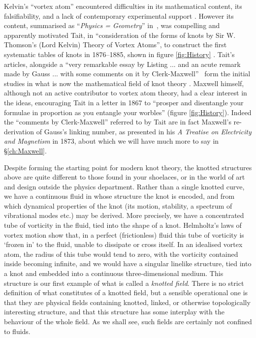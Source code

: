 Kelvin's ``vortex atom'' encountered difficulties in its mathematical content, its falsifiability, and a lack of contemporary experimental support \citep{KelvinMasters}. However its content, summarised as ``\textit{Physics = Geometry}'' in~\citep{KelvinAMS}, was compelling and apparently motivated Tait, in ``consideration of the forms of knots by Sir W. Thomson's (Lord Kelvin) Theory of Vortex Atoms'', to construct the first systematic tables of knots in 1876--1885, shown in figure \ref{fig:History} \citep{Tait1, Tait2, Tait3}. Tait's articles, alongside a ``very remarkable essay by Listing ... and an acute remark made by Gauss ... with some comments on it by Clerk-Maxwell''~\citep{Tait1} form the initial studies in what is now the mathematical field of knot theory \citep{Lickorish1997}. Maxwell himself, although not an active contributor to vortex atom theory, had a clear interest in the ideas, encouraging Tait in a letter in 1867 to ``prosper and disentangle your formulae in proportion as you entangle your worbles'' (figure \ref{fig:History}). Indeed the ``comments by Clerk-Maxwell'' referred to by Tait are in fact Maxwell's re-derivation of Gauss's linking number, as presented in his \textit{A Treatise on Electricity and Magnetism} \citep{Maxwell2} in 1873, about which we will have much more to say in \S\ref{ch:Maxwell}. 

Despite forming the starting point for modern knot theory, the knotted structures above are quite different to those found in your shoelaces, or in the world of art and design outside the physics department. Rather than a single knotted curve, we have a continuous fluid in whose structure the knot is encoded, and from which dynamical properties of the knot (its motion, stability, a spectrum of vibrational modes etc.) may be derived. More precisely, we have a concentrated tube of vorticity in the fluid, tied into the shape of a knot. Helmholtz's laws of vortex motion \citep{Helmholtz} show that, in a perfect (frictionless) fluid this tube of vorticity is `frozen in' to the fluid, unable to dissipate or cross itself. In an idealised vortex atom, the radius of this tube would tend to zero, with the vorticity contained inside becoming infinite, and we would have a singular linelike structure, tied into a knot and embedded into a continuous three-dimensional medium. This structure is our first example of what is called a \emph{knotted field}. There is no strict definition of what constitutes of a knotted field, but a sensible operational one is that they are physical fields containing knotted, linked, or otherwise topologically interesting structure, and that this structure has some interplay with the behaviour of the whole field. As we shall see, such fields are certainly not confined to fluids.

